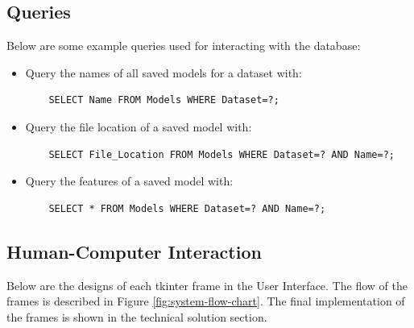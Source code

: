 \documentclass[./project-report/src/latex/project-report.tex]{subfiles}
\begin{document}
\subsection{Queries}

Below are some example queries used for interacting with the database:

\begin{itemize}
    \item Query the names of all saved models for a dataset with:
    \begin{verbatim}
    SELECT Name FROM Models WHERE Dataset=?;
    \end{verbatim}
    \item Query the file location of a saved model with:
    \begin{verbatim}
    SELECT File_Location FROM Models WHERE Dataset=? AND Name=?;
    \end{verbatim}
    \item Query the features of a saved model with:
    \begin{verbatim}
    SELECT * FROM Models WHERE Dataset=? AND Name=?;
    \end{verbatim}
\end{itemize}

\subsection{Human-Computer Interaction}

Below are the designs of each tkinter frame in the User Interface. The flow of the frames is described in Figure \ref{fig:system-flow-chart}. The final implementation of the 
frames is shown in the technical solution section.
\end{document}
